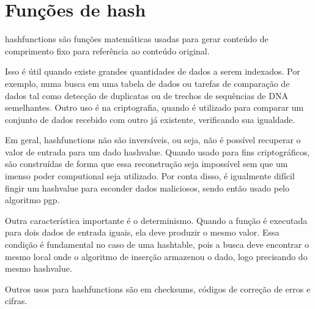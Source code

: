 
\section{Funções de hash}
\label{sec:sha1}

\Glspl{hashfunction} são funções matemáticas usadas para gerar conteúdo de comprimento
fixo para referência ao conteúdo original.

Isso é útil quando existe grandes quantidades de dados a serem indexados. Por exemplo,
numa busca em uma tabela de dados ou tarefas de comparação de dados tal como detecção de
duplicatas ou de trechos de sequências de DNA semelhantes. Outro uso é na criptografia,
quando é utilizado para comparar um conjunto de dados recebido com outro já existente,
verificando sua igualdade.

Em geral, \glspl*{hashfunction} não são inversíveis, ou seja, não é possível recuperar o
valor de entrada para um dado \gls{hashvalue}. Quando usado para fins criptográficos,
são construídas de forma que essa reconstrução seja impossível sem que um imenso poder
computional seja utilizado. Por conta disso, é igualmente difícil fingir um
\gls*{hashvalue} para esconder dados maliciosos, sendo então usado pelo algoritmo
\gls{pgp}.

Outra característica importante é o determinismo. Quando a função é executada para dois
dados de entrada iguais, ela deve produzir o mesmo valor. Essa condição é fundamental
no caso de uma \gls*{hashtable}, pois a busca deve encontrar o mesmo local onde o
algoritmo de inserção armazenou o dado, logo precisando do mesmo \gls*{hashvalue}.

Outros usos para \glspl*{hashfunction} são em \glspl{checksum}, códigos de correção de
erros e cifras.

